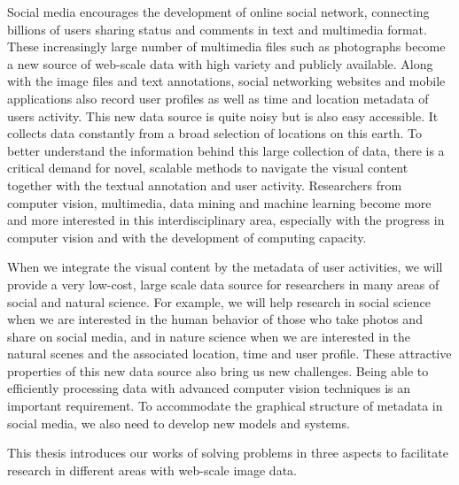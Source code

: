 Social media encourages the development of online social network, connecting billions of users sharing status and comments in text and multimedia format.
These increasingly large number of multimedia files such as photographs become a new source of web-scale data with high variety and publicly available.
Along with the image files and text annotations, social networking websites and mobile applications also record user profiles as well as time and location metadata of users activity.
This new data source is quite noisy but is also easy accessible. 
It collects data constantly from a broad selection of locations on this earth. 
To better understand the information behind this large collection of data, there is a critical demand for novel, scalable methods to navigate the visual content together with the textual annotation and user activity.
Researchers from computer vision, multimedia, data mining and machine learning become more and more interested in this interdisciplinary area, especially with the progress in computer vision and with the development of computing capacity.

When we integrate the visual content by the metadata of user activities, we will provide a very low-cost, large scale data source for researchers in many areas of social and natural science.
For example, we will help research in social science when we are interested in the human behavior of those who take photos and share on social media, and in nature science when we are interested in the natural scenes and the associated location, time and user profile.
These attractive properties of this new data source also bring us new challenges. 
Being able to efficiently processing data with advanced computer vision techniques is an important requirement.
To accommodate the graphical structure of metadata in social media, we also need to develop new models and systems.

This thesis introduces our works of solving problems in three aspects to facilitate research in different areas with web-scale image data.
